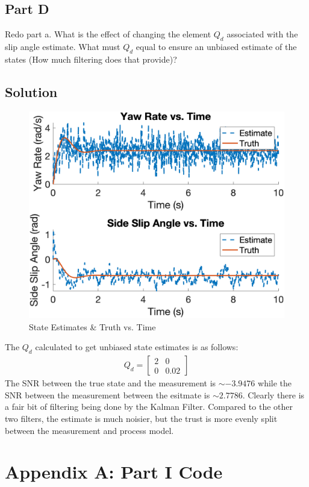 \documentclass{article}
\begin{document}
\subsection*{Part D}
Redo part a.  What is the effect of changing the element $Q_d$ associated with the slip angle estimate.  What must $Q_d$ equal to ensure an unbiased estimate of the states (How much filtering does that provide)?
\subsection*{Solution}
\begin{figure}[H]
    \centering
    \includegraphics[width=0.75\linewidth]{../figures/p4d_kf.png}
    \caption{State Estimates \& Truth vs. Time}\label{fig:p4d_kf}
\end{figure}
The $Q_d$ calculated to get unbiased state estimates is as follows:
\begin{gather*}
    Q_d = \begin{bmatrix}
        2 & 0\\
        0 & 0.02
    \end{bmatrix}
\end{gather*}
The SNR between the true state and the measurement is $\sim -3.9476$ while the SNR between the measurement between the esitmate is $\sim 2.7786$.  Clearly there is a fair bit of filtering being done by the Kalman Filter.  Compared to the other two filters, the estimate is much noisier, but the trust is more evenly split between the measurement and process model.

\section*{Appendix A: Part I Code}

\end{document}
